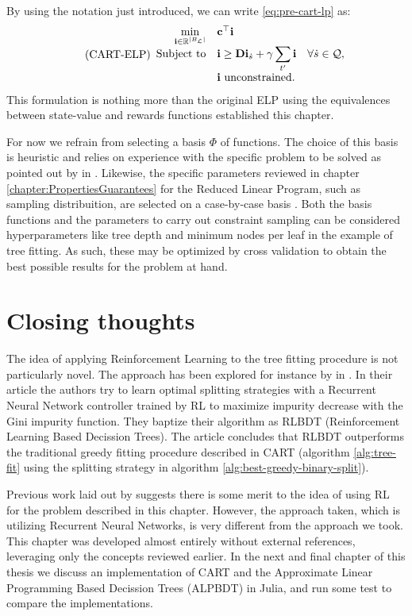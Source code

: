 By using the notation just introduced, we can write \eqref{eq:pre-cart-lp} as:
\begin{equation}
\tag{CART-ELP}
\label{lp:cart-elp}
\begin{array}{rl@{}ll}
    \displaystyle \min_{\vec{i} \in \R^{|B_\L|}} & \vec{c}^{\top} \vec{i} \\
    \text{Subject to} & \displaystyle \vec{i} \geq \vec{Di}_{\dot{s}} + \gamma \sum_{t'} \vec{i} & \quad \forall \dot{s} \in \mathcal{Q}, \\
    & \vec{i} \text{ unconstrained.} &
\end{array}
\end{equation}
This formulation is nothing more than the original ELP using the equivalences between state-value and rewards functions established this chapter.

For now we refrain from selecting a basis $\Phi$ of functions. The choice of
this basis is heuristic and relies on experience with the specific problem to be
solved as pointed out by \citeauthor{farias2003LP2ADP} in
\cite{farias2003LP2ADP}. Likewise, the specific parameters reviewed in chapter
\ref{chapter:PropertiesGuarantees} for the Reduced Linear Program, such as
sampling distribuition, are selected on a case-by-case basis
\cite{farias2004constraint}. Both the basis functions and the parameters to
carry out constraint sampling can be considered hyperparameters like tree depth
and minimum nodes per leaf in the example of tree fitting. As such, these may be
optimized by cross validation \cite[Ch.~2.1]{intro2statslearning} to obtain the
best possible results for the problem at hand.  

\section{Closing thoughts}

The idea of applying Reinforcement Learning to the tree fitting procedure is not
particularly novel. The approach has been explored for instance by
\citeauthor{xiong} in \cite{xiong}. In their article the authors try to learn
optimal splitting strategies with a Recurrent Neural Network controller trained
by RL to maximize impurity decrease with the Gini impurity function. They
baptize their algorithm as RLBDT (Reinforcement Learning Based Decission Trees).
The article concludes that RLBDT outperforms the traditional greedy fitting
procedure described in CART (algorithm \ref{alg:tree-fit} using the splitting
strategy in algorithm \ref{alg:best-greedy-binary-split}).

Previous work laid out by \citeauthor{xiong} suggests there is some merit to the
idea of using RL for the problem described in this chapter. However, the
approach taken, which is utilizing Recurrent Neural Networks, is very different
from the approach we took. This chapter was developed almost entirely without
external references, leveraging only the concepts reviewed earlier. In the next
and final chapter of this thesis we discuss an implementation of CART and the
Approximate Linear Programming Based Decission Trees (ALPBDT) in Julia, and run
some test to compare the implementations.